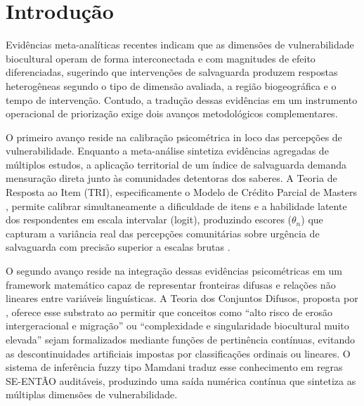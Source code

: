 \documentclass[pdflatex,sn-basic]{sn-jnl}%
\theoremstyle{thmstyleone}%
\theoremstyle{thmstyletwo}%
\theoremstyle{thmstylethree}%
\begin{document}

\maketitle


\section{Introdução}\label{sec:intro}


Evidências meta-analíticas recentes indicam que as dimensões de vulnerabilidade biocultural operam de forma interconectada e com magnitudes de efeito diferenciadas, sugerindo que intervenções de salvaguarda produzem respostas heterogêneas segundo o tipo de dimensão avaliada, a região biogeográfica e o tempo de intervenção. Contudo, a tradução dessas evidências em um instrumento operacional de priorização exige dois avanços metodológicos complementares.

O primeiro avanço reside na calibração psicométrica in loco das percepções de vulnerabilidade. Enquanto a meta-análise sintetiza evidências agregadas de múltiplos estudos, a aplicação territorial de um índice de salvaguarda demanda mensuração direta junto às comunidades detentoras dos saberes. A Teoria de Resposta ao Item (TRI), especificamente o Modelo de Crédito Parcial de Masters \citep{Masters1982}, permite calibrar simultaneamente a dificuldade de itens e a habilidade latente dos respondentes em escala intervalar (logit), produzindo escores ($\theta_n$) que capturam a variância real das percepções comunitárias sobre urgência de salvaguarda com precisão superior a escalas brutas \citep{Bond2020,Rasch1960}.

O segundo avanço reside na integração dessas evidências psicométricas em um framework matemático capaz de representar fronteiras difusas e relações não lineares entre variáveis linguísticas. A Teoria dos Conjuntos Difusos, proposta por \citet{Zadeh1965}, oferece esse substrato ao permitir que conceitos como ``alto risco de erosão intergeracional e migração'' ou ``complexidade e singularidade biocultural muito elevada'' sejam formalizados mediante funções de pertinência contínuas, evitando as descontinuidades artificiais impostas por classificações ordinais ou lineares. O sistema de inferência fuzzy tipo Mamdani \citep{Mamdani1975} traduz esse conhecimento em regras SE-ENTÃO auditáveis, produzindo uma saída numérica contínua que sintetiza as múltiplas dimensões de vulnerabilidade.
\end{document}
